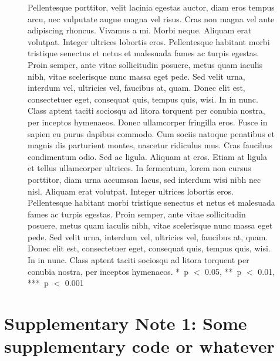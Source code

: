 \documentclass{biorxiv}
\begin{document}
\begin{figure}[t]
  \centering
  \figureplaceholder{147.3mm}{85.6mm}%
  \caption{
     Pellentesque porttitor, velit lacinia egestas auctor, diam
    eros tempus arcu, nec vulputate augue magna vel risus. Cras non magna
    vel ante adipiscing rhoncus. Vivamus a mi. Morbi neque. Aliquam erat
    volutpat. Integer ultrices lobortis eros. Pellentesque habitant morbi
    tristique senectus et netus et malesuada fames ac turpis egestas.
     Proin semper, ante vitae sollicitudin posuere, metus quam
    iaculis nibh, vitae scelerisque nunc massa eget pede. Sed velit urna,
    interdum vel, ultricies vel, faucibus at, quam. Donec elit est,
    consectetuer eget, consequat quis, tempus quis, wisi. In in nunc. Class
    aptent taciti sociosqu ad litora torquent per conubia nostra, per
    inceptos hymenaeos. Donec ullamcorper fringilla eros. Fusce in sapien eu
    purus dapibus commodo. Cum sociis natoque penatibus et magnis dis
    parturient montes, nascetur ridiculus mus. Cras faucibus condimentum
    odio.  Sed ac ligula. Aliquam at eros. Etiam at ligula et
    tellus ullamcorper ultrices. In fermentum, lorem non cursus porttitor,
    diam urna accumsan lacus, sed interdum wisi nibh nec nisl. 
    Aliquam erat volutpat. Integer ultrices lobortis eros. Pellentesque
    habitant morbi tristique senectus et netus et malesuada fames ac turpis
    egestas. Proin semper, ante vitae sollicitudin posuere, metus quam
    iaculis nibh, vitae scelerisque nunc massa eget pede. Sed velit urna,
    interdum vel, ultricies vel, faucibus at, quam. Donec elit est,
    consectetuer eget, consequat quis, tempus quis, wisi. In in nunc. Class
    aptent taciti sociosqu ad litora torquent per conubia nostra, per
    inceptos hymenaeos. *~p $<$ 0.05, **~p $<$ 0.01, ***~p
    $<$ 0.001}
  \label{fig:S1}
\end{figure}

\clearpage
\section{Supplementary Note 1: Some supplementary code or whatever}
\end{document}
